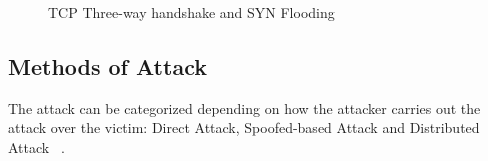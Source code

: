 \begin{figure}[htb]
	\centering
	\hfill
	\caption{TCP Three-way handshake and SYN Flooding} 
	\label{fig:TCPConnections}
\end{figure}



\subsection{Methods of Attack}
\label{subsec:SYNMethodsOfAttacks}

The attack can be categorized depending on how the attacker carries out the attack over the victim: Direct Attack, Spoofed-based Attack and Distributed Attack ~\cite{CiscoTCPSYN}.


